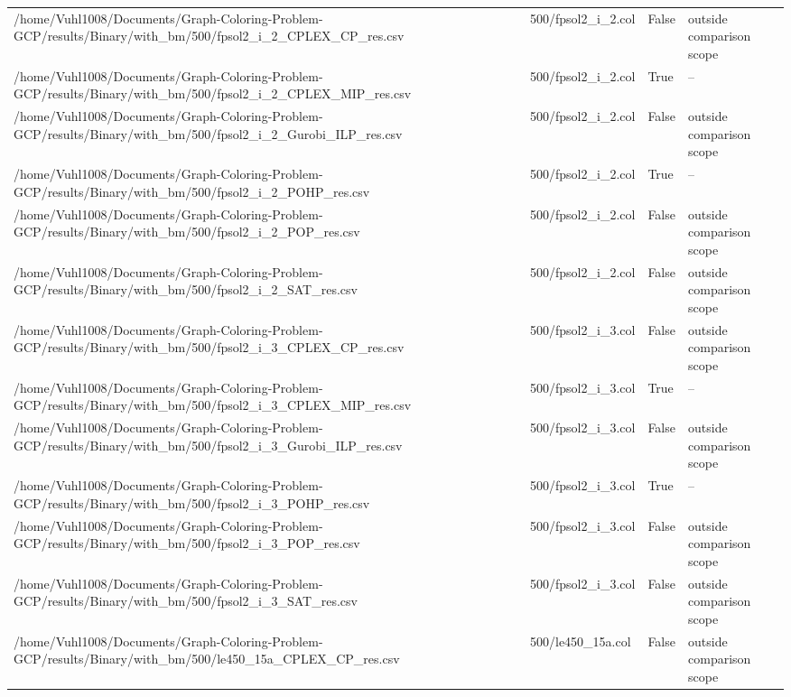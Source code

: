 \begin{table}[htbp]
\begin{tabular}{llll}
/home/Vuhl1008/Documents/Graph-Coloring-Problem-GCP/results/Binary/with\_bm/500/fpsol2\_i\_2\_CPLEX\_CP\_res.csv & 500/fpsol2\_i\_2.col & False & outside comparison scope \\
/home/Vuhl1008/Documents/Graph-Coloring-Problem-GCP/results/Binary/with\_bm/500/fpsol2\_i\_2\_CPLEX\_MIP\_res.csv & 500/fpsol2\_i\_2.col & True & -- \\
/home/Vuhl1008/Documents/Graph-Coloring-Problem-GCP/results/Binary/with\_bm/500/fpsol2\_i\_2\_Gurobi\_ILP\_res.csv & 500/fpsol2\_i\_2.col & False & outside comparison scope \\
/home/Vuhl1008/Documents/Graph-Coloring-Problem-GCP/results/Binary/with\_bm/500/fpsol2\_i\_2\_POHP\_res.csv & 500/fpsol2\_i\_2.col & True & -- \\
/home/Vuhl1008/Documents/Graph-Coloring-Problem-GCP/results/Binary/with\_bm/500/fpsol2\_i\_2\_POP\_res.csv & 500/fpsol2\_i\_2.col & False & outside comparison scope \\
/home/Vuhl1008/Documents/Graph-Coloring-Problem-GCP/results/Binary/with\_bm/500/fpsol2\_i\_2\_SAT\_res.csv & 500/fpsol2\_i\_2.col & False & outside comparison scope \\
/home/Vuhl1008/Documents/Graph-Coloring-Problem-GCP/results/Binary/with\_bm/500/fpsol2\_i\_3\_CPLEX\_CP\_res.csv & 500/fpsol2\_i\_3.col & False & outside comparison scope \\
/home/Vuhl1008/Documents/Graph-Coloring-Problem-GCP/results/Binary/with\_bm/500/fpsol2\_i\_3\_CPLEX\_MIP\_res.csv & 500/fpsol2\_i\_3.col & True & -- \\
/home/Vuhl1008/Documents/Graph-Coloring-Problem-GCP/results/Binary/with\_bm/500/fpsol2\_i\_3\_Gurobi\_ILP\_res.csv & 500/fpsol2\_i\_3.col & False & outside comparison scope \\
/home/Vuhl1008/Documents/Graph-Coloring-Problem-GCP/results/Binary/with\_bm/500/fpsol2\_i\_3\_POHP\_res.csv & 500/fpsol2\_i\_3.col & True & -- \\
/home/Vuhl1008/Documents/Graph-Coloring-Problem-GCP/results/Binary/with\_bm/500/fpsol2\_i\_3\_POP\_res.csv & 500/fpsol2\_i\_3.col & False & outside comparison scope \\
/home/Vuhl1008/Documents/Graph-Coloring-Problem-GCP/results/Binary/with\_bm/500/fpsol2\_i\_3\_SAT\_res.csv & 500/fpsol2\_i\_3.col & False & outside comparison scope \\
/home/Vuhl1008/Documents/Graph-Coloring-Problem-GCP/results/Binary/with\_bm/500/le450\_15a\_CPLEX\_CP\_res.csv & 500/le450\_15a.col & False & outside comparison scope \\

\end{tabular}
\end{table}
